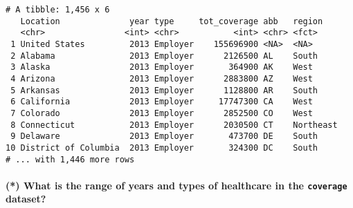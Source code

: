 \documentclass[]{article}
\newenvironment{Shaded}{\begin{snugshade}}{\end{snugshade}}
\newcommand{\CommentTok}[1]{\textcolor[rgb]{0.56,0.35,0.01}{\textit{#1}}}
\newcommand{\KeywordTok}[1]{\textcolor[rgb]{0.13,0.29,0.53}{\textbf{#1}}}
\newcommand{\NormalTok}[1]{#1}
\newcommand{\OperatorTok}[1]{\textcolor[rgb]{0.81,0.36,0.00}{\textbf{#1}}}
\newcommand{\StringTok}[1]{\textcolor[rgb]{0.31,0.60,0.02}{#1}}
\let\oldparagraph\paragraph
\renewcommand{\paragraph}[1]{\oldparagraph{#1}\mbox{}}
\begin{document}
\begin{Shaded}
\end{Shaded}

\begin{verbatim}
# A tibble: 1,456 x 6
   Location              year type     tot_coverage abb   region   
   <chr>                <int> <chr>           <int> <chr> <fct>    
 1 United States         2013 Employer    155696900 <NA>  <NA>     
 2 Alabama               2013 Employer      2126500 AL    South    
 3 Alaska                2013 Employer       364900 AK    West     
 4 Arizona               2013 Employer      2883800 AZ    West     
 5 Arkansas              2013 Employer      1128800 AR    South    
 6 California            2013 Employer     17747300 CA    West     
 7 Colorado              2013 Employer      2852500 CO    West     
 8 Connecticut           2013 Employer      2030500 CT    Northeast
 9 Delaware              2013 Employer       473700 DE    South    
10 District of Columbia  2013 Employer       324300 DC    South    
# ... with 1,446 more rows
\end{verbatim}

\hypertarget{what-is-the-range-of-years-and-types-of-healthcare-in-the-coverage-dataset}{%
\paragraph{\texorpdfstring{(*) What is the range of years and types of
healthcare in the \texttt{coverage}
dataset?}{(*) What is the range of years and types of healthcare in the coverage dataset?}}\label{what-is-the-range-of-years-and-types-of-healthcare-in-the-coverage-dataset}}

\begin{Shaded}
\end{Shaded}
\end{document}
